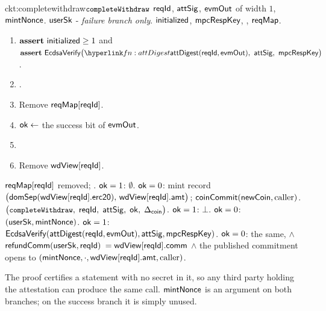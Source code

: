 \begin{CktBox}{ckt:completewithdraw}{$\texttt{\small completeWithdraw}$}
 $\mathsf{reqId}$, $\mathsf{attSig}$, $\mathsf{evmOut}$ of width $1$, $\mathsf{mintNonce}$.
 $\mathsf{userSk}$ - \emph{failure branch only}.
 $\mathsf{initialized}$, $\mathsf{mpcRespKey}$, \ADDEDINL{$\wdView[\rid]$}, $\mathsf{reqMap}$.
\begin{enumerate}[nosep,leftmargin=1.7em,topsep=2pt]
\item $\textbf{assert}~ \mathsf{initialized} \geq 1$ and
      $\assert \EcdsaVf\bigl(\lnk{fn:attDigest}{\attDigest(\rid, \evmOut)}\bc \attSig\bc
      \mpcRespKey\bigr)$.
\item \ADDEDINL{$\assert \rid \in \wdView$}.
\item Remove $\mathsf{reqMap}[\mathsf{reqId}]$. 
\item $\mathsf{ok} \gets$ the success bit of $\mathsf{evmOut}$.
\item {}
\item Remove $\wdView[\rid]$.
\end{enumerate}
\begin{OutList}
\oitem{\Dvault} $\mathsf{reqMap}[\mathsf{reqId}]$ removed; .
\oitem{\Dshd} $\mathsf{ok} = 1$: $\emptyset$. \quad $\mathsf{ok} = 0$: \bluedot mint record
  $\bigl(\mathsf{domSep}(\mathsf{wdView}[\mathsf{reqId}].\mathsf{erc20}),\, \mathsf{wdView}[\mathsf{reqId}].\mathsf{amt}\bigr)$; \;
  \bluedot $\mathsf{coinCommit}(\mathsf{newCoin}, \text{caller})$.
\oitem{\stmt} $\bigl(\texttt{\small completeWithdraw},\; \mathsf{reqId},\; \mathsf{attSig},\; \mathsf{ok},\; \Delta_{\mathsf{coin}}\bigr)$.
\oitem{\wit} $\mathsf{ok} = 1$: $\bot$. \quad $\mathsf{ok} = 0$: $(\mathsf{userSk}, \mathsf{mintNonce})$.
\oitem{\Rel} $\mathsf{ok} = 1$: $\mathsf{EcdsaVerify}(\mathsf{attDigest}(\mathsf{reqId},\mathsf{evmOut}), \mathsf{attSig}, \mathsf{mpcRespKey})$. \quad
  $\mathsf{ok} = 0$: the same, $\wedge$ $\mathsf{refundComm}(\mathsf{userSk}, \mathsf{reqId})$ $= \mathsf{wdView}[\mathsf{reqId}].\mathsf{comm}$ $\wedge$
  the published commitment opens to $(\mathsf{mintNonce}, \cdot, \mathsf{wdView}[\mathsf{reqId}].\mathsf{amt}, \text{caller})$.
\end{OutList}
 The proof certifies a statement with no secret in it, so
any third party holding the attestation can produce the same call. $\mathsf{mintNonce}$ is an argument on
both branches; on the success branch it is simply unused.
\end{CktBox}



